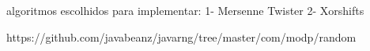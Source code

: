 \documentclass[openany]{ufsctex/ufsctex}
\begin{document}
    \folhaderosto
    \sumario

    algoritmos escolhidos para implementar:
    1- Mersenne Twister
    2- Xorshifts
    
    https://github.com/javabeanz/javarng/tree/master/com/modp/random
    
    
\end{document}
